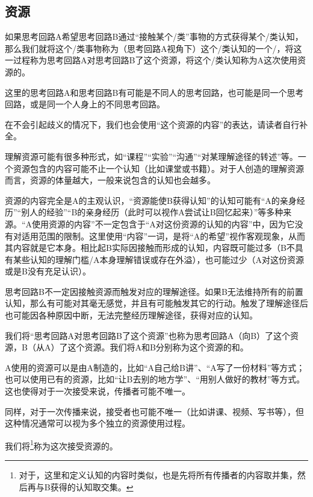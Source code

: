 \subsection{资源}
如果思考回路A希望思考回路B通过“接触某个/类”事物的方式获得某个/类认知，那么我们就将这个/类事物称为（思考回路A视角下）这个/类认知的一个/，将这一过程称为思考回路A对思考回路B了这个资源，将这个/类认知称为A这次使用资源的。
\begin{explain}
这里的思考回路A和思考回路B有可能是不同人的思考回路，也可能是同一个思考回路，或是同一个人身上的不同思考回路。

在不会引起歧义的情况下，我们也会使用“这个资源的内容”的表达，请读者自行补全。

理解资源可能有很多种形式，如“课程”“实验”“沟通”“对某理解途径的转述”等。一个资源包含的内容可能不止一个认知（比如课堂或书籍）。对于人创造的理解资源而言，资源的体量越大，一般来说包含的认知也会越多。

资源的内容完全是A的主观认识，“资源能使B获得认知”的认知可能有“A的亲身经历”“别人的经验”“B的亲身经历（此时可以视作A尝试让B回忆起来）”等多种来源。“A使用资源的内容”不一定包含于“A对这份资源的认知的内容”中，因为它没有对适用范围的限制。这里使用“内容”一词，是将“A的希望”视作客观现象，从而其内容就是它本身。相比起B实际因接触而形成的认知，内容既可能过多（B不具有某些认知的理解门槛/A本身理解错误或存在外溢），也可能过少（A对这份资源或是B没有充足认识）。

思考回路B不一定因接触资源而触发对应的理解途径。如果B无法维持所有的前置认知，那么有可能对其毫无感觉，并且有可能触发其它的行动。触发了理解途径后也可能因各种原因中断，无法完整经历理解途径，获得对应的认知。
\end{explain}
我们将“思考回路A对思考回路B了这个资源”也称为思考回路A（向B）了这个资源，B（从A）了这个资源。我们将A和B分别称为这个资源的和。
\begin{explain}
A使用的资源可以是由A制造的，比如“A自己给B讲”、“A写了一份材料”等方式；也可以使用已有的资源，比如“让B去别的地方学”、“用别人做好的教材”等方式。这也使得对于一次接受来说，传播者可能不唯一。

同样，对于一次传播来说，接受者也可能不唯一（比如讲课、视频、写书等），但这种情况通常可以视为多个独立的资源使用过程。
\end{explain}
我们将\footnote{对于\rigorous，这里和定义认知的内容时类似，也是先将所有传播者的内容取并集，然后再与B获得的认知取交集。}称为这次接受资源的。
